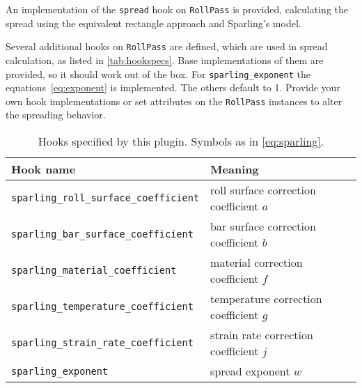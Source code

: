 \documentclass[11pt]{PyRollDocs}
\begin{document}
    An implementation of the \lstinline{spread} hook on \lstinline{RollPass} is provided,
    calculating the spread using the equivalent rectangle approach and Sparling's model.

    Several additional hooks on \lstinline{RollPass} are defined, which are used in spread calculation, as listed in \autoref{tab:hookspecs}.
    Base implementations of them are provided, so it should work out of the box.
    For \lstinline{sparling_exponent} the equations~\ref{eq:exponent} is implemented.
    The others default to \num{1}.
    Provide your own hook implementations or set attributes on the \lstinline{RollPass} instances to alter the spreading behavior.

    \begin{table}
        \centering
        \caption{Hooks specified by this plugin. Symbols as in \autoref{eq:sparling}.}
        \label{tab:hookspecs}
        \begin{tabular}{ll}
            \toprule
            Hook name                                     & Meaning                                 \\
            \midrule
            \texttt{sparling\_roll\_surface\_coefficient} & roll surface correction coefficient $a$ \\
            \texttt{sparling\_bar\_surface\_coefficient}  & bar surface correction coefficient $b$  \\
            \texttt{sparling\_material\_coefficient}      & material correction coefficient $f$     \\
            \texttt{sparling\_temperature\_coefficient}      & temperature correction coefficient $g$  \\
            \texttt{sparling\_strain\_rate\_coefficient}      & strain rate correction coefficient $j$  \\
            \texttt{sparling\_exponent}                   & spread exponent $w$                     \\
            \bottomrule
        \end{tabular}
    \end{table}

    \printbibliography
\end{document}
